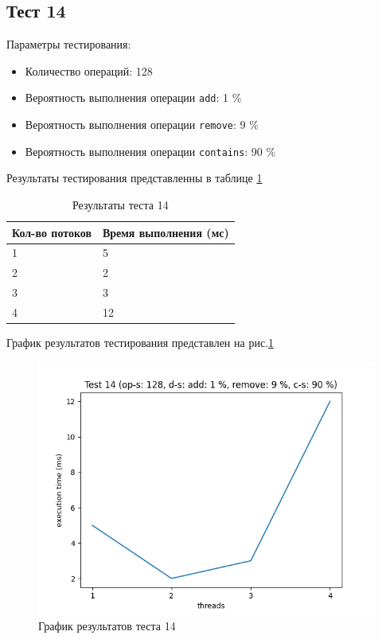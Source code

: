 \subsection*{Тест 14}

Параметры тестирования:

\begin{itemize}
    \item Количество операций: 128
    \item Вероятность выполнения операции \verb|add|: 1 \%
    \item Вероятность выполнения операции \verb|remove|: 9 \%
    \item Вероятность выполнения операции \verb|contains|: 90 \%
\end{itemize}

Результаты тестирования представленны в таблице \ref{tab:results14}


\begin{table}[H]
    \centering
    \begin{tabular}{|l|l|}
        \hline
        Кол-во потоков & Время выполнения (мс) \\
        \hline
        1 & 5 \\
        \hline
        2 & 2 \\
        \hline
        3 & 3 \\
        \hline
        4 & 12 \\
        \hline
    \end{tabular}
    \caption{Результаты теста 14}
    \label{tab:results14}
\end{table}
        

График результатов тестирования представлен на рис.\ref{fig:plot14}

\begin{figure}[H]
    \centering
    \includegraphics[width=0.7\linewidth]{photo/plot14}
    \caption{График результатов теста 14}
    \label{fig:plot14}
\end{figure}

